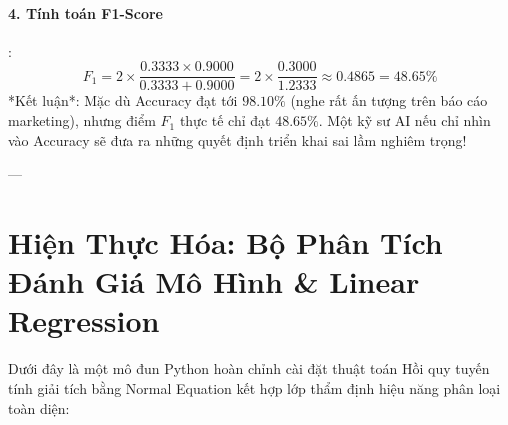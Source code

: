 \begin{example}
\paragraph{4. Tính toán F1-Score}:
\begin{equation*}
F_1 = 2 \times \frac{0.3333 \times 0.9000}{0.3333 + 0.9000} = 2 \times \frac{0.3000}{1.2333} \approx 0.4865 = 48.65\%
\end{equation*}
*Kết luận*: Mặc dù Accuracy đạt tới $98.10\%$ (nghe rất ấn tượng trên báo cáo marketing), nhưng điểm $F_1$ thực tế chỉ đạt $48.65\%$. Một kỹ sư AI nếu chỉ nhìn vào Accuracy sẽ đưa ra những quyết định triển khai sai lầm nghiêm trọng!
\end{example}

---

\section{Hiện Thực Hóa: Bộ Phân Tích Đánh Giá Mô Hình \& Linear Regression}
\label{sec:ch05-implementation}

Dưới đây là một mô đun Python hoàn chỉnh cài đặt thuật toán Hồi quy tuyến tính giải tích bằng Normal Equation kết hợp lớp thẩm định hiệu năng phân loại toàn diện:

